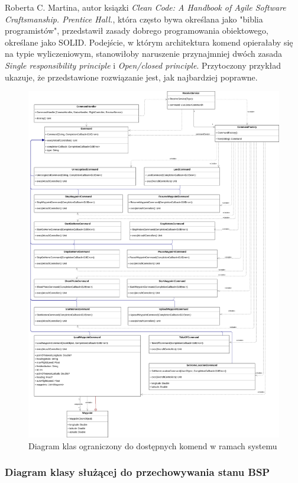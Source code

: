 Roberta C. Martina, autor ksiązki \textit{Clean Code: A Handbook of Agile Software Craftsmanship. Prentice Hall.}, która często bywa określana jako "biblia programistów", przedstawił zasady dobrego programowania obiektowego, określane jako SOLID. Podejście, w którym architektura komend opierałaby się na typie wyliczeniowym, stanowiłoby naruszenie przynajmniej dwóch zasada \textit{Single responsibility principle} i \textit{Open/closed principle}. Przytoczony przykład ukazuje, że przedstawione rozwiązanie jest, jak najbardziej poprawne.\cite{solid}\cite{clean-code}

\begin{figure}[!htbp]
  \centering
  \includegraphics[width=16cm]{./Obrazy/commands.png}
  \caption{Diagram klas ograniczony do dostępnych komend w ramach systemu}
  \end{figure}


\newpage
\subsubsection{Diagram klasy służącej do przechowywania stanu BSP}

